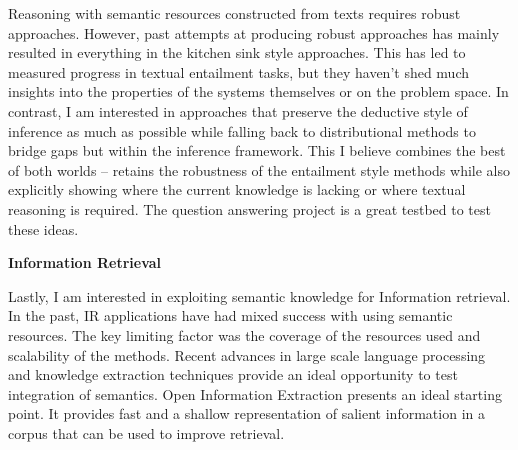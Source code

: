 \documentclass[a4paper,11pt,onecolumn]{article}
\begin{document}
Reasoning with semantic resources constructed from texts requires robust approaches. However, past attempts at producing robust approaches has mainly resulted in everything in the kitchen sink style approaches. This has led to measured progress in textual entailment tasks, but they haven't shed much insights into the properties of the systems themselves or on the problem space. In contrast, I am interested in approaches that preserve the deductive style of inference as much as possible while falling back to distributional methods to bridge gaps but within the inference framework. This I believe combines the best of both worlds -- retains the robustness of the entailment style methods while also explicitly showing where the current knowledge is lacking or where textual reasoning is required. The question answering project is a great testbed to test these ideas.

{\bf Information Retrieval}

Lastly, I am interested in exploiting semantic knowledge for Information retrieval. In the past, IR applications have had mixed success with using semantic resources. The key limiting factor was the coverage of the resources used and scalability of the methods. Recent advances in large scale language processing and knowledge extraction techniques provide an ideal opportunity to test integration of semantics. Open Information Extraction presents an ideal starting point. It provides fast and a shallow representation of salient information in a corpus that can be used to improve retrieval. 
\end{document}
